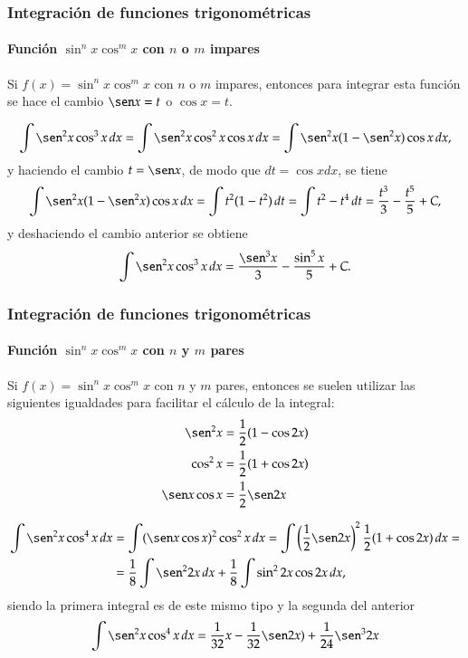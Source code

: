 \begin{frame}
\frametitle{Integración de funciones trigonométricas}
\framesubtitle{Función $\sin^n x\cos^m x$ con $n$ o $m$ impares}
Si $f(x)=\sin^n x\cos^m x$ con $n$ o $m$ impares, entonces para integrar esta función se hace el cambio $\sen x = t$ o
$\cos x =t$.

\[
\int \sen^2 x\cos^3 x\, dx = \int \sen^2 x\cos^2 x\cos x\, dx = \int \sen^2 x(1-\sen^2 x)\cos x\, dx,
\]
y haciendo el cambio $t=\sen x$, de modo que $dt = \cos x dx$, se tiene
\[
\int \sen^2 x(1-\sen^2 x)\cos x\, dx = \int t^2(1-t^2)\, dt = \int t^2-t^4 \, dt = \frac{t^3}{3}-\frac{t^5}{5}+C,
\]
y deshaciendo el cambio anterior se obtiene
\[
\int \sen^2 x\cos^3 x\, dx = \frac{\sen^3 x}{3}-\frac{\sin^5 x}{5}+C.
\]
\end{frame}


\begin{frame}
\frametitle{Integración de funciones trigonométricas}
\framesubtitle{Función $\sin^n x\cos^m x$ con $n$ y $m$ pares}
Si $f(x)=\sin^n x\cos^m x$ con $n$ y $m$ pares, entonces se suelen utilizar las siguientes igualdades para facilitar el
cálculo de la integral:
\begin{align*}
\sen^2 x &= \frac{1}{2}(1-\cos 2x)\\
\cos^2 x &= \frac{1}{2}(1+\cos 2x)\\
\sen x\cos x &= \frac{1}{2}\sen 2x
\end{align*}

\begin{align*}
\int \sen^2 x\cos^4 x\, dx &= \int (\sen x\cos x)^2\cos^2 x\, dx = \int \left(\frac{1}{2}\sen
2x\right)^2\frac{1}{2}(1+\cos 2x)\,dx =\\
&= \frac{1}{8}\int \sen^2 2x\,dx+\frac{1}{8}\int \sin^2 2x \cos 2x\,dx,
\end{align*}
siendo la primera integral es de este mismo tipo y la segunda del anterior
\[
\int \sen^2 x\cos^4 x\, dx = \frac{1}{32}x-\frac{1}{32}\sen 2x)+\frac{1}{24}\sen^3 2x
\] 
\end{frame}


